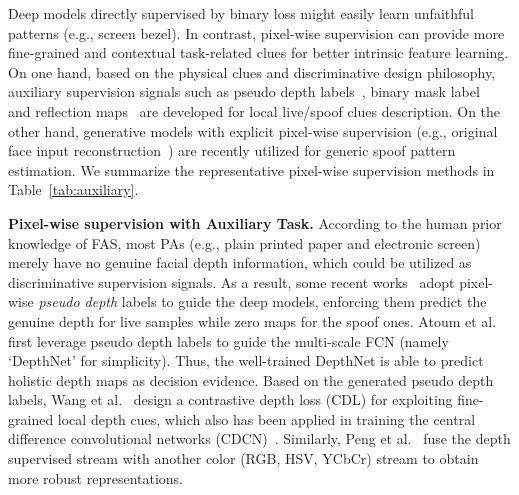\documentclass[10pt,journal,compsoc]{IEEEtran}
\begin{document}
Deep models directly supervised by binary loss might easily learn unfaithful patterns (e.g., screen bezel). In contrast, pixel-wise supervision can provide more fine-grained and contextual task-related clues for better intrinsic feature learning. On one hand, based on the physical clues and discriminative design philosophy, auxiliary supervision signals such as pseudo depth labels~\cite{Atoum2018Face,Liu2018Learning}, binary mask label~\cite{george2019deep,liu2019deep,sun2020face} and reflection maps~\cite{yu2020face,kim2019basn} are developed for local live/spoof clues description. On the other hand, generative models with explicit pixel-wise supervision (e.g., original face input reconstruction~\cite{mohammadi2020improving,liu2020physics}) are recently utilized for generic spoof pattern estimation. We summarize the representative pixel-wise supervision methods in Table~\ref{tab:auxiliary}. 






\vspace{0.4em}
\noindent\textbf{Pixel-wise supervision with Auxiliary Task.}\quad
According to the human prior knowledge of FAS, most PAs (e.g., plain printed paper and electronic screen) merely have no genuine facial depth information, which could be utilized as discriminative supervision signals. As a result, some recent works~\cite{Atoum2018Face,peng2020ts,yu2020searching,wang2020deep} adopt pixel-wise \textit{pseudo depth} labels to guide the deep models, enforcing them predict the genuine depth for live samples while zero maps for the spoof ones. Atoum et al.~\cite{Atoum2018Face} first leverage pseudo depth labels to guide the multi-scale FCN (namely `DepthNet' for simplicity). Thus, the well-trained DepthNet is able to predict holistic depth maps as decision evidence. Based on the generated pseudo depth labels, Wang et al.~\cite{wang2020deep} design a contrastive depth loss (CDL) for exploiting fine-grained local depth cues, which also has been applied in training the central difference convolutional networks (CDCN)~\cite{yu2020searching,yu2020fas2,yu2021dual}. Similarly, Peng et al.~\cite{peng2020ts} fuse the depth supervised stream with another color (RGB, HSV, YCbCr) stream to obtain more robust representations. 
\end{document}
